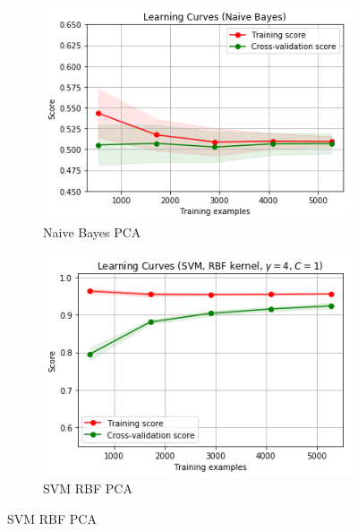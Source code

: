 \begin{figure}[ht!]
\centering
\begin{subfigure}{.5\textwidth}
  \centering
  \includegraphics[width=.8\linewidth]{figures/NB_PCA.png}
  \caption{Naive Bayes PCA}
  \label{fig:sub1}
\end{subfigure}%
\begin{subfigure}{.5\textwidth}
  \centering
  \includegraphics[width=.8\linewidth]{figures/SVM-RBF-PCA.png}
  \caption{SVM RBF PCA}
  \label{fig:sub2}
\end{subfigure}


\end{figure}
